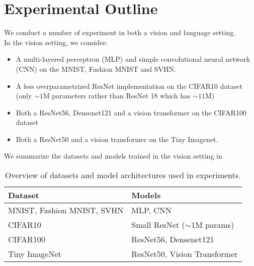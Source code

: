 \documentclass[12pt]{book}
\begin{document}
\section{Experimental Outline}
We conduct a number of experiment in both a vision and language setting. \\
In the vision setting, we consider:
\begin{itemize}
\item A multi-layered perceptron (MLP) and simple convolutional neural network (CNN) on the MNIST, Fashion MNIST and SVHN.
\item A less overparametrized ResNet implementation on the CIFAR10 dataset (only $\sim 1$M parameters rather than ResNet 18 which has $\sim 11$M)
\item Both a ResNet56\footnotemark{}, Densenet121 \cite{huang2018denselyconnectedconvolutionalnetworks} and a vision transformer on the CIFAR100 dataset
\item Both a ResNet50 and a vision transformer on the Tiny Imagenet. 
\end{itemize}
We summarize the datasets and models trained in the vision setting in 
\begin{table}[h]
\centering
\label{tab: vision}
\begin{tabular}{ll}
\toprule
\textbf{Dataset} & \textbf{Models} \\
\midrule
MNIST, Fashion MNIST, SVHN & MLP, CNN \\
CIFAR10 & Small ResNet ($\sim$1M params) \\
CIFAR100 & ResNet56\footnotemark{}, Densenet121\\
Tiny ImageNet & ResNet50, Vision Transformer \\
\bottomrule
\end{tabular}
\caption{Overview of datasets and model architectures used in experiments.}
\end{table}
\end{document}

